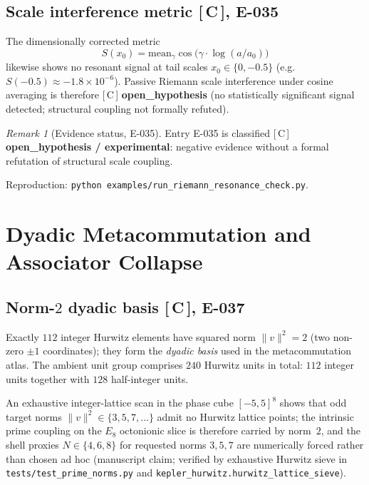 \documentclass[11pt, lettersize, article]{article}
\theoremstyle{definition}
\theoremstyle{remark}
\newtheorem{remark}[theorem]{Remark}
\newcommand{\evidence}[1]{\textnormal{[\,#1\,]}}
\begin{document}
\subsection{Scale interference metric \evidence{C}, E-035}

The dimensionally corrected metric
\[
  S(x_0) = \mathrm{mean}_\gamma \cos\bigl(\gamma \cdot \log(a/a_0)\bigr)
\]
likewise shows no resonant signal at tail scales $x_0 \in \{0,-0.5\}$ (e.g.\ $S(-0.5)\approx -1.8\times 10^{-6}$).
Passive Riemann scale interference under cosine averaging is therefore \evidence{C} \textbf{open\_hypothesis} (no statistically significant signal detected; structural coupling not formally refuted).

\begin{remark}[Evidence status, E-035]
Entry E-035 is classified \evidence{C} \textbf{open\_hypothesis / experimental}: negative evidence without a formal refutation of structural scale coupling.
\end{remark}

Reproduction: \texttt{python examples/run\_riemann\_resonance\_check.py}.

\section{Dyadic Metacommutation and Associator Collapse}
\label{sec:metacommutation}

\subsection{Norm-$2$ dyadic basis \evidence{C}, E-037}

Exactly $112$ integer Hurwitz elements have squared norm $\|v\|^2=2$ (two non-zero $\pm 1$ coordinates); they form the \emph{dyadic basis} used in the metacommutation atlas.
The ambient unit group comprises $240$ Hurwitz units in total: $112$ integer units together with $128$ half-integer units.

An exhaustive integer-lattice scan in the phase cube $[-5,5]^8$ shows that odd target norms $\|v\|^2\in\{3,5,7,\ldots\}$ admit no Hurwitz lattice points; the intrinsic prime coupling on the $E_8$ octonionic slice is therefore carried by norm~$2$, and the shell proxies $N\in\{4,6,8\}$ for requested norms $3,5,7$ are numerically forced rather than chosen ad hoc
(manuscript claim; verified by exhaustive Hurwitz sieve in \texttt{tests/test\_prime\_norms.py} and \texttt{kepler\_hurwitz.hurwitz\_lattice\_sieve}).
\end{document}
